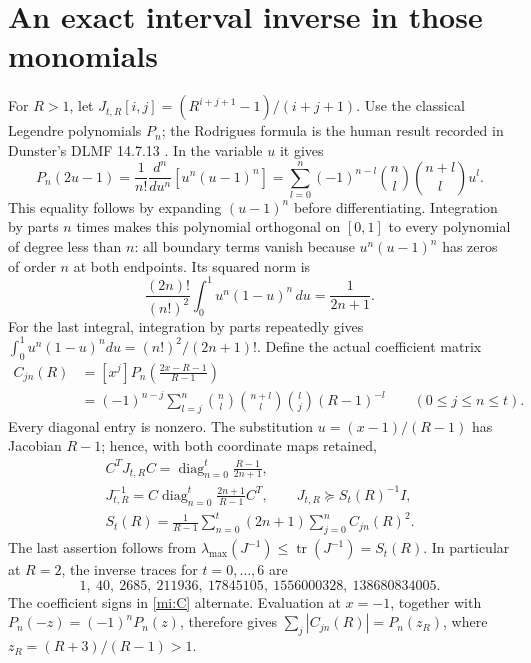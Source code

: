 \documentclass[11pt]{article}
\begin{document}
\section{An exact interval inverse in those monomials}

For $R>1$, let
$J_{t,R}[i,j]=(R^{i+j+1}-1)/(i+j+1)$.
Use the classical Legendre polynomials $P_n$; the Rodrigues formula
is the human result recorded in Dunster's DLMF 14.7.13
\cite{Dunster}. In the variable $u$ it gives
\[
 P_n(2u-1)=\frac1{n!}\frac{d^n}{du^n}[u^n(u-1)^n]
 =\sum_{l=0}^n(-1)^{n-l}\binom nl\binom{n+l}l u^l.
\]
This equality follows by expanding $(u-1)^n$ before differentiating.
Integration by parts $n$ times makes this polynomial orthogonal on
$[0,1]$ to every polynomial of degree less than $n$: all boundary
terms vanish because $u^n(u-1)^n$ has zeros of order $n$ at both
endpoints. Its squared norm is
\[
 \frac{(2n)!}{(n!)^2}\int_0^1u^n(1-u)^n\,du=\frac1{2n+1}.
\]
For the last integral, integration by parts repeatedly gives
$\int_0^1u^n(1-u)^n du=(n!)^2/(2n+1)!$.
Define the actual coefficient matrix
\begin{equation}\tag{MI4}\label{mi:C}
\begin{split}
 C_{jn}(R)
 &=[x^j]P_n\!\left(\frac{2x-R-1}{R-1}\right)\\
 &=(-1)^{n-j}\sum_{l=j}^n
   \binom nl\binom{n+l}l\binom lj(R-1)^{-l}
       \qquad(0\le j\le n\le t).
\end{split}
\end{equation}
Every diagonal entry is nonzero. The substitution
$u=(x-1)/(R-1)$ has Jacobian $R-1$; hence, with both coordinate
maps retained,
\begin{equation}\tag{MI5}\label{mi:inverse}
 \begin{gathered}
 C^TJ_{t,R}C=\operatorname{diag}_{n=0}^t\frac{R-1}{2n+1},\\
 J_{t,R}^{-1}
 =C\operatorname{diag}_{n=0}^t\frac{2n+1}{R-1}C^T,\qquad
 J_{t,R}\succeq S_t(R)^{-1}I,\\
 S_t(R)=\frac1{R-1}\sum_{n=0}^t(2n+1)\sum_{j=0}^n C_{jn}(R)^2.
 \end{gathered}
\end{equation}
The last assertion follows from
$\lambda_{\max}(J^{-1})\le\operatorname{tr}(J^{-1})=S_t(R)$.
In particular at $R=2$, the inverse traces for $t=0,\ldots,6$ are
\[
 1,\ 40,\ 2685,\ 211936,\ 17845105,\ 1556000328,\ 138680834005.
\]
The coefficient signs in \eqref{mi:C} alternate. Evaluation at
$x=-1$, together with $P_n(-z)=(-1)^nP_n(z)$, therefore gives
$\sum_j|C_{jn}(R)|=P_n(z_R)$, where
$z_R=(R+3)/(R-1)>1$.
\end{document}
